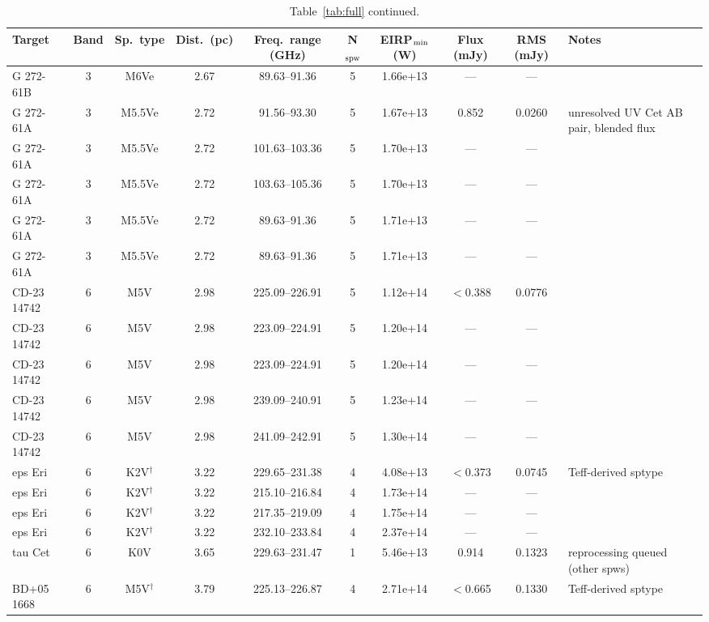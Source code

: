 \documentclass{openjournal}
\begin{document}
\begin{table}
\centering
\scriptsize
\caption{Table~\ref{tab:full} continued.}
\label{tab:full2}
\begin{tabularx}{\textwidth}{@{}l c c c c c c c c X@{}}
\hline
Target & Band & Sp.\ type & Dist.\ (pc) & Freq.\ range (GHz) & N$_{\rm spw}$ & EIRP$_{\rm min}$ (W) & Flux (mJy) & RMS (mJy) & Notes \\
\hline
G 272-61B & 3 & M6Ve & 2.67 & 89.63--91.36 & 5 & 1.66e+13 & --- & --- &  \\
G 272-61A & 3 & M5.5Ve & 2.72 & 91.56--93.30 & 5 & 1.67e+13 & 0.852 & 0.0260 & unresolved UV Cet AB pair, blended flux \\
G 272-61A & 3 & M5.5Ve & 2.72 & 101.63--103.36 & 5 & 1.70e+13 & --- & --- &  \\
G 272-61A & 3 & M5.5Ve & 2.72 & 103.63--105.36 & 5 & 1.70e+13 & --- & --- &  \\
G 272-61A & 3 & M5.5Ve & 2.72 & 89.63--91.36 & 5 & 1.71e+13 & --- & --- &  \\
G 272-61A & 3 & M5.5Ve & 2.72 & 89.63--91.36 & 5 & 1.71e+13 & --- & --- &  \\
CD-23 14742 & 6 & M5V & 2.98 & 225.09--226.91 & 5 & 1.12e+14 & $<$0.388 & 0.0776 &  \\
CD-23 14742 & 6 & M5V & 2.98 & 223.09--224.91 & 5 & 1.20e+14 & --- & --- &  \\
CD-23 14742 & 6 & M5V & 2.98 & 223.09--224.91 & 5 & 1.20e+14 & --- & --- &  \\
CD-23 14742 & 6 & M5V & 2.98 & 239.09--240.91 & 5 & 1.23e+14 & --- & --- &  \\
CD-23 14742 & 6 & M5V & 2.98 & 241.09--242.91 & 5 & 1.30e+14 & --- & --- &  \\
eps Eri & 6 & K2V$^\dagger$ & 3.22 & 229.65--231.38 & 4 & 4.08e+13 & $<$0.373 & 0.0745 & Teff-derived sptype \\
eps Eri & 6 & K2V$^\dagger$ & 3.22 & 215.10--216.84 & 4 & 1.73e+14 & --- & --- &  \\
eps Eri & 6 & K2V$^\dagger$ & 3.22 & 217.35--219.09 & 4 & 1.75e+14 & --- & --- &  \\
eps Eri & 6 & K2V$^\dagger$ & 3.22 & 232.10--233.84 & 4 & 2.37e+14 & --- & --- &  \\
tau Cet & 6 & K0V & 3.65 & 229.63--231.47 & 1 & 5.46e+13 & 0.914 & 0.1323 & reprocessing queued (other spws) \\
BD+05  1668 & 6 & M5V$^\dagger$ & 3.79 & 225.13--226.87 & 4 & 2.71e+14 & $<$0.665 & 0.1330 & Teff-derived sptype \\

\end{tabularx}
\end{table}
\end{document}
